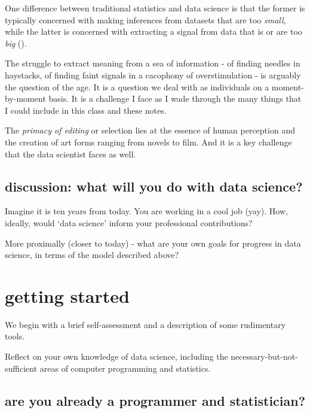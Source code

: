 \documentclass[openany]{book}
\begin{document}
One difference between traditional statistics and data science is that the former is typically concerned with making inferences from datasets that are too \emph{small}, while the latter is concerned with extracting a signal from data that is or are too \emph{big} (\citet{donoho2015fifty}).

The struggle to extract meaning from a sea of information - of finding needles in haystacks, of finding faint signals in a cacophony of overstimulation - is arguably the question of the age. It is a question we deal with as individuals on a moment-by-moment basis. It is a challenge I face as I wade through the many things that I could include in this class and these notes.

The \emph{primacy of editing} or selection lies at the essence of human perception and the creation of art forms ranging from novels to film. And it is a key challenge that the data scientist faces as well.

\hypertarget{discussion-what-will-you-do-with-data-science}{%
\section{discussion: what will you do with data science?}\label{discussion-what-will-you-do-with-data-science}}

Imagine it is ten years from today. You are working in a cool job (yay). How, ideally, would `data science' inform your professional contributions?

More proximally (closer to today) - what are your own goals for progress in data science, in terms of the model described above?

\hypertarget{getting-started}{%
\chapter{getting started}\label{getting-started}}

We begin with a brief self-assessment and a description of some rudimentary tools.

Reflect on your own knowledge of data science, including the necessary-but-not-sufficient areas of computer programming and statistics.

\hypertarget{are-you-already-a-programmer-and-statistician}{%
\section{are you already a programmer and statistician?}\label{are-you-already-a-programmer-and-statistician}}
\end{document}
